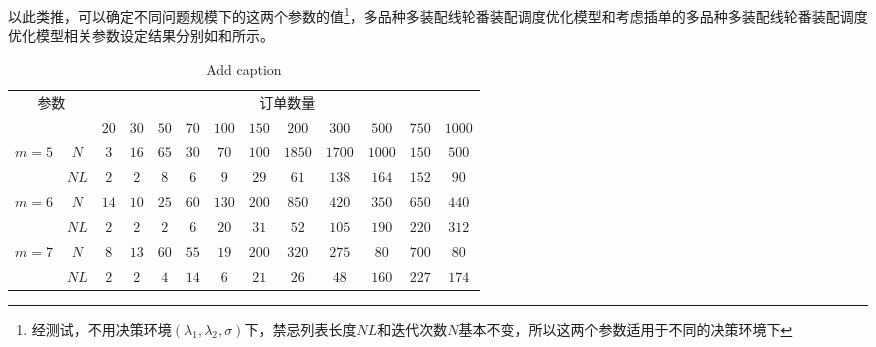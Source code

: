 以此类推，可以确定不同问题规模下的这两个参数的值\footnote{经测试，不用决策环境$(\lambda_1, \lambda_2, \sigma)$下，禁忌列表长度$NL$和迭代次数$N$基本不变，所以这两个参数适用于不同的决策环境下}，多品种多装配线轮番装配调度优化模型和考虑插单的多品种多装配线轮番装配调度优化模型相关参数设定结果分别如和所示。
\begin{table}[htbp]
  \centering
  \caption{Add caption}
    \begin{tabular}{ccccccccccccc}
    \toprule
    \multicolumn{2}{c}{\multirow{2}[0]{*}{参数}} & \multicolumn{11}{c}{订单数量} \\
        \multicolumn{2}{c}{} & $20 $   & $30$    & $50$    & $70$    & $100$   & $150 $  & $200$   & $300$   & $500$   & $750$   & $1000$ \\
      \midrule
    \multirow{2}[0]{*}{$m=5$} & $N$     & $3$     & $16$    & $65$    & $30$    & $70$    & $100$   & $1850$  & $1700$  & $1000$  & $150$   & $500$ \\
          & $NL$    & $2$     & $2$     & $8$     & $6$     & $9$     & $29$    & $61$    & $138$   & $164$   & $152$   & $90$ \\
    \multirow{2}[0]{*}{$m=6$} & $N$     & $14$    & $10$    & $25$    & $60$    & $130$   & $200$   & $850$   & $420$   &  $350 $     &  $650 $     &$440$  \\
          & $NL$    & $2$     & $2$     & $2$     & $6$     & $20$    & $31$    & $52$    & $105$   & $190$   & $220$   & $312$ \\
    \multirow{2}[0]{*}{$m=7$} & $N$     & $8$     & $13$    &$ 60    $&$ 55    $&$ 19    $&$ 200   $&$ 320   $&$ 275   $&$80       $&$      700 $&$80  $\\
          &$ NL    $&$ 2     $&$ 2     $&$ 4     $&$ 14    $&$ 6     $&$ 21    $&$ 26    $&$ 48    $&$ 160   $&$ 227   $&$ 174 $\\
    \bottomrule
    \end{tabular}%
  \label{tab:addlabel}%
\end{table}%

